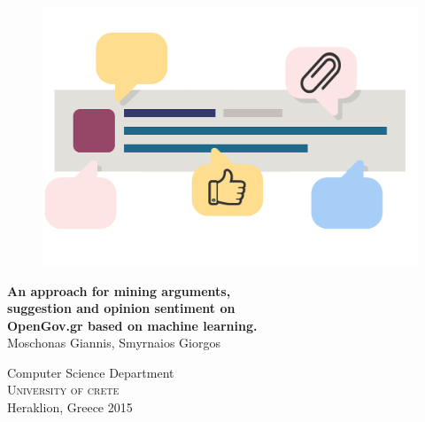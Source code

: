 
\begin{titlepage}
			
\addtolength{\voffset}{2cm}

\begin{figure}[H]
\centering
\vspace{1cm}	%
\includegraphics[width=0.9\linewidth]{figure/front_image.png}
\end{figure}

\mbox{}
\vfill
\renewcommand{\familydefault}{\sfdefault} \normalfont %
\textbf{{\huge An approach for mining arguments, \\suggestion and opinion sentiment on \\ OpenGov.gr based on machine learning.}} 	\\[0.5cm]

{\Large Moschonas Giannis, Smyrnaios Giorgos} \setlength{\parskip}{2.9cm}

Computer Science Department \\
\textsc{University of crete} \\
Heraklion, Greece 2015

\renewcommand{\familydefault}{\rmdefault} \normalfont %
\end{titlepage}


